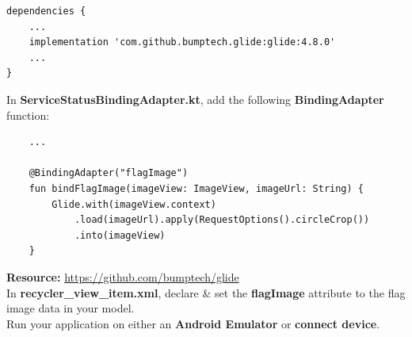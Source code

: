 \documentclass{article}
\begin{document}
\begin{verbatim}
dependencies {
    ...
    implementation 'com.github.bumptech.glide:glide:4.8.0'
    ...
}
\end{verbatim}

In \textbf{ServiceStatusBindingAdapter.kt}, add the following \textbf{BindingAdapter} function:

\begin{verbatim}
    ...

    @BindingAdapter("flagImage")
    fun bindFlagImage(imageView: ImageView, imageUrl: String) {
        Glide.with(imageView.context)
            .load(imageUrl).apply(RequestOptions().circleCrop())
            .into(imageView)
    }
\end{verbatim}

\textbf{Resource:} \href{https://github.com/bumptech/glide}{https://github.com/bumptech/glide} \\

In \textbf{recycler\_view\_item.xml}, declare \& set the \textbf{flagImage} attribute to the flag image data in your model. \\

Run your application on either an \textbf{Android Emulator} or \textbf{connect device}. \\ 
\end{document}
